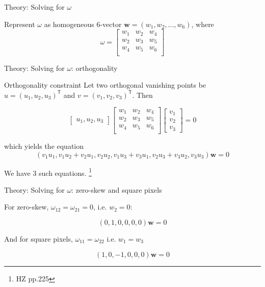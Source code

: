 \documentclass{beamer}
\newcommand\blfootnote[1]{%
	\begingroup
	\renewcommand\thefootnote{}\footnote{#1}%
	\addtocounter{footnote}{-1}%
	\endgroup
}
\begin{document}
\begin{frame}{Theory: Solving for $ \omega $}


Represent $ \omega $ as homogeneous 6-vector $ \textbf{w} = (w_1, w_2, ..., w_6) $,
where 
\[
\omega = 
\begin{bmatrix}
w_1 & w_2 & w_4 \\
w_2 & w_3 & w_5 \\
w_4 & w_5 & w_6 \\
\end{bmatrix}
\]
\end{frame} 

\begin{frame}{Theory: Solving for $ \omega $: orthogonality}
\begin{block}{Orthogonality constraint}
Let two orthogonal vanishing points be $ u = (u_1, u_2, u_3) ^\mathsf{T} $ and $ v = (v_1, v_2, v_3) ^\mathsf{T} $. Then

\[
\begin{bmatrix}
u_1, u_2, u_3
\end{bmatrix}
\begin{bmatrix}
w_1 & w_2 & w_4 \\
w_2 & w_3 & w_5 \\
w_4 & w_5 & w_6 \\
\end{bmatrix}
\begin{bmatrix}
v_1 \\
v_2 \\
v_3
\end{bmatrix}
= 0
\]

which yields the equation
\[ (v_1 u_1 , v_1 u_2 + v_2 u_1 , v_2u_2, v_1 u_3 + v_3 u_1 , v_2 u_3 + v_3 u_2, v_3 u_3) \textbf{w} = 0
\]
\end{block}
We have 3 such equations.
\blfootnote{HZ pp.225}

\end{frame}	

\begin{frame}{Theory: Solving for $ \omega $: zero-skew and square pixels}

For zero-skew, $\omega_{12} = \omega_{21} = 0 $, i.e. $ w_2 = 0 $:

\[
(0, 1, 0, 0, 0, 0) \textbf{w} = 0 
\]

And for square pixels, $ \omega_{11} = \omega_{22} $ i.e.	$ w_1  = w_3 $

\[
(1, 0, -1, 0, 0, 0) \textbf{w} = 0 
\]

\end{frame}
\end{document}
